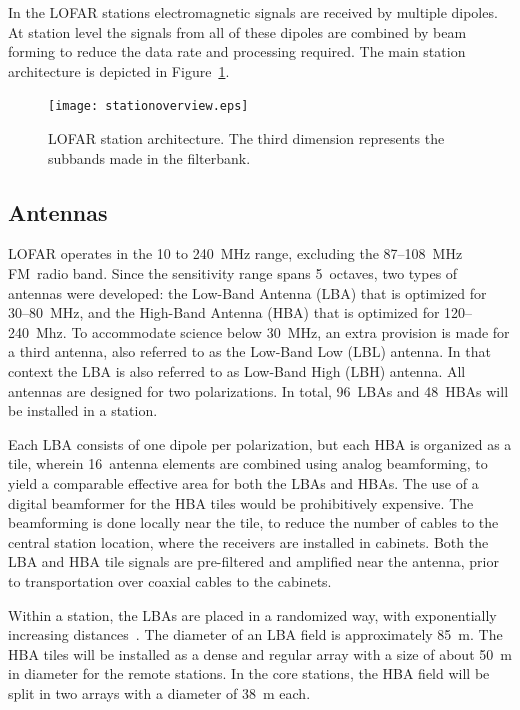 \documentclass[journal]{IEEEtran}
\begin{document}
In the LOFAR stations electromagnetic signals are received by multiple dipoles. At station level the signals from all of these dipoles are combined by beam forming to reduce the data rate and processing required. The main station architecture is depicted in Figure~\ref{fig:stationarch}. 

\begin{figure}
\begin{center}
\texttt{[image: stationoverview.eps]}
\end{center}
\caption{LOFAR station architecture. The third dimension represents the subbands made in the filterbank.}
\label{fig:stationarch}
\end{figure}

\subsection{Antennas}

LOFAR operates in the 10 to 240~MHz range, excluding the 87--108~MHz FM~radio
band.
Since the sensitivity range spans 5~octaves, two types of antennas were
developed:
the Low-Band Antenna (LBA) that is optimized for 30--80~MHz,
and the High-Band Antenna (HBA) that is optimized for 120--240~Mhz.
To accommodate science below 30~MHz, an extra provision is made for a
third antenna, also referred to as the Low-Band Low (LBL) antenna.
In that context the LBA is also referred to as Low-Band High (LBH) antenna.
All antennas are designed for two polarizations.
In total, 96~LBAs and 48~HBAs will be installed in a station. 

Each LBA consists of one dipole per polarization, but
each HBA is organized as a tile, wherein 16~antenna elements are combined using
analog beamforming, to yield a comparable effective area for both the LBAs and
HBAs.
The use of a digital beamformer for the HBA tiles would be prohibitively
expensive.
The beamforming is done locally near the tile, to reduce the number of cables
to the central station location, where the receivers are installed in cabinets.
Both the LBA and HBA tile signals are pre-filtered and amplified near the
antenna, prior to transportation over coaxial cables to the cabinets.

Within a station, the LBAs are placed in a randomized way, with exponentially
increasing distances~\cite{capp:06}.
The diameter of an LBA field is approximately 85~m.
The HBA tiles will be installed as a dense and regular array with a size of
about 50~m in diameter for the remote stations.
In the core stations, the HBA field will be split in two arrays with a diameter
of 38~m each. 
\end{document}
